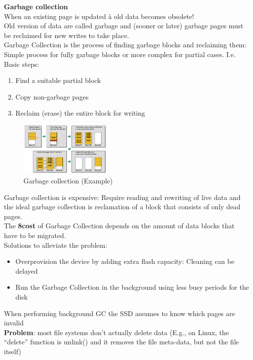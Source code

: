 \documentclass[10pt, oneside]{article}
\begin{document}
{\bf Garbage collection}\\
When an existing page is updated à old data becomes obsolete!\\
Old version of data are called garbage and (sooner or later) garbage pages must be reclaimed for new writes to take place.\\
Garbage Collection is the process of finding garbage blocks and reclaiming them: Simple process for fully garbage blocks or more complex for partial cases. I.e. Basic steps: 
\begin{enumerate}
    \item Find a suitable partial block
    \item Copy non-garbage pages
    \item Reclaim (erase) the entire block for writing
\end{enumerate}
\begin{figure}[H]
    \begin{center}
    \includegraphics[width=0.4\textwidth]{img/img16.png}
    \caption{Garbage collection (Example)}
    \label{fig:GC ex}
    \end{center}
\end{figure}
Garbage collection is expensive: Require reading and rewriting of live data and the ideal garbage collection is reclamation of a block that consists of only dead pages.\\
The {\bf8cost} of Garbage Collection depends on the amount of data blocks that have to be migrated.\\
Solutions to alleviate the problem:
\begin{itemize}
    \item Overprovision the device by adding extra flash capacity: Cleaning can be delayed
    \item Run the Garbage Collection in the background using less busy periods for the disk
\end{itemize}
When performing background GC the SSD assumes to know which pages are invalid\\
{\bf Problem}: most file systems don’t actually delete data (E.g., on Linux, the “delete” function is unlink() and it removes the file meta-data, but not the file itself)
\end{document}
